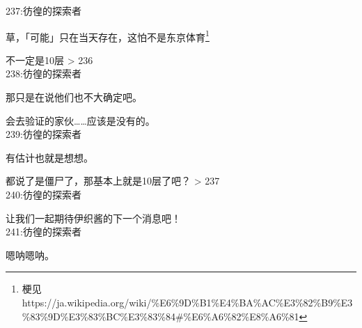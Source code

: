 237:彷徨的探索者

草，「可能」只在当天存在，这怕不是东京体育\footnote{梗见 https://ja.wikipedia.org/wiki/\%E6\%9D\%B1\%E4\%BA\%AC\%E3\%82\%B9\%E3\%83\%9D\%E3\%83\%BC\%E3\%83\%84#\%E6\%A6\%82\%E8\%A6\%81}

不一定是10层 > 236\\

238:彷徨的探索者

那只是在说他们也不大确定吧。

会去验证的家伙……应该是没有的。\\

239:彷徨的探索者

有估计也就是想想。

都说了是僵尸了，那基本上就是10层了吧？ > 237\\

240:彷徨的探索者

让我们一起期待伊织酱的下一个消息吧！\\

241:彷徨的探索者

嗯呐嗯呐。\\
